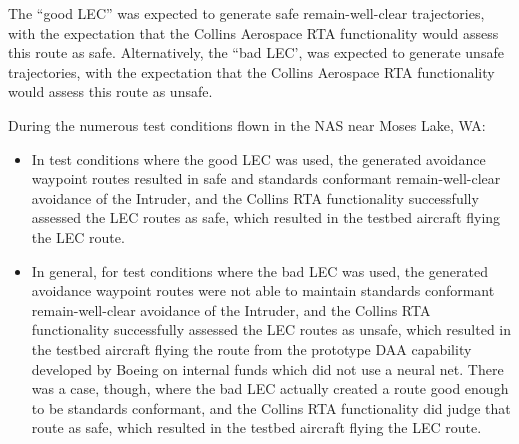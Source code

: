 The ``good LEC'' was expected to generate safe remain-well-clear trajectories, with the expectation that the Collins Aerospace RTA functionality would assess this route as safe.  Alternatively, the “bad LEC’, was expected to generate unsafe trajectories, with the expectation that the Collins Aerospace RTA functionality would assess this route as unsafe.

During the numerous test conditions flown in the NAS near Moses Lake, WA:
\begin{itemize}
\item In test conditions where the good LEC was used, the generated avoidance waypoint routes resulted in safe and standards conformant remain-well-clear avoidance of the Intruder, and the Collins RTA functionality successfully assessed the LEC routes as safe, which resulted in the testbed aircraft flying the LEC route.
\item In general, for test conditions where the bad LEC was used, the generated avoidance waypoint routes were not able to maintain standards conformant remain-well-clear avoidance of the Intruder, and the Collins RTA functionality successfully assessed the LEC routes as unsafe, which resulted in the testbed aircraft flying the route from the prototype DAA capability developed by Boeing on internal funds which did not use a neural net.  There was a case, though, where the bad LEC actually created a route good enough to be standards conformant, and the Collins RTA functionality did judge that route as safe, which resulted in the testbed aircraft flying the LEC route.
\end{itemize}
